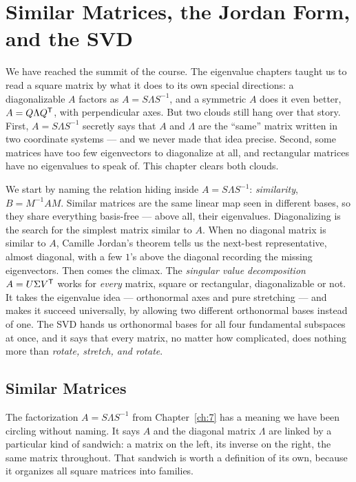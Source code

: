 \chapter{Similar Matrices, the Jordan Form, and the SVD}
\label{ch:9}

We have reached the summit of the course. The eigenvalue chapters taught us to read a square matrix by what it does to its own special directions: a diagonalizable $A$ factors as $A=S\Lambda S^{-1}$, and a symmetric $A$ does it even better, $A=Q\Lambda Q^{\mathsf T}$, with perpendicular axes. But two clouds still hang over that story. First, $A=S\Lambda S^{-1}$ secretly says that $A$ and $\Lambda$ are the ``same'' matrix written in two coordinate systems --- and we never made that idea precise. Second, some matrices have too few eigenvectors to diagonalize at all, and rectangular matrices have no eigenvalues to speak of. This chapter clears both clouds.

We start by naming the relation hiding inside $A=S\Lambda S^{-1}$: \emph{similarity}, $B=M^{-1}AM$. Similar matrices are the same linear map seen in different bases, so they share everything basis-free --- above all, their eigenvalues. Diagonalizing is the search for the simplest matrix similar to $A$. When no diagonal matrix is similar to $A$, Camille Jordan's theorem tells us the next-best representative, almost diagonal, with a few $1$'s above the diagonal recording the missing eigenvectors. Then comes the climax. The \emph{singular value decomposition} $A=U\Sigma V^{\mathsf T}$ works for \emph{every} matrix, square or rectangular, diagonalizable or not. It takes the eigenvalue idea --- orthonormal axes and pure stretching --- and makes it succeed universally, by allowing two different orthonormal bases instead of one. The SVD hands us orthonormal bases for all four fundamental subspaces at once, and it says that every matrix, no matter how complicated, does nothing more than \emph{rotate, stretch, and rotate}.

\section{Similar Matrices}

The factorization $A=S\Lambda S^{-1}$ from Chapter~\ref{ch:7} has a meaning we have been circling without naming. It says $A$ and the diagonal matrix $\Lambda$ are linked by a particular kind of sandwich: a matrix on the left, its inverse on the right, the same matrix throughout. That sandwich is worth a definition of its own, because it organizes all square matrices into families.

